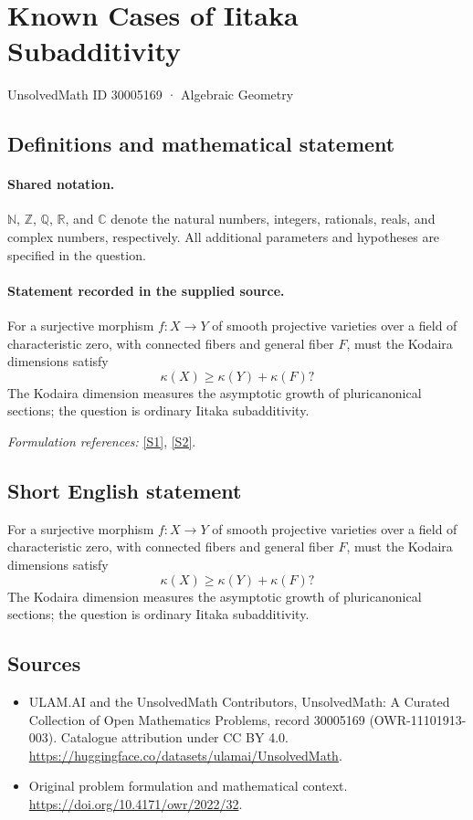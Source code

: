 \documentclass[11pt]{article}
\newcommand{\sref}[2]{\hyperlink{source:#1:#2}{[S#2]}}
\begin{document}
\setcounter{section}{30005168}
\section{Known Cases of Iitaka Subadditivity}\label{30005169}
{\small UnsolvedMath ID 30005169 · Algebraic Geometry}
\subsection{Definitions and mathematical statement}

\paragraph{Shared notation.}$\mathbb N$, $\mathbb Z$, $\mathbb Q$, $\mathbb R$, and $\mathbb C$ denote the natural numbers, integers, rationals, reals, and complex numbers, respectively. All additional parameters and hypotheses are specified in the question.


\paragraph{Statement recorded in the supplied source.}
For a surjective morphism $f:X\to Y$ of smooth projective varieties over a field of characteristic zero, with connected fibers and general fiber $F$, must the Kodaira dimensions satisfy
\[\kappa(X)\geq\kappa(Y)+\kappa(F)?\]
The Kodaira dimension measures the asymptotic growth of pluricanonical sections; the question is ordinary Iitaka subadditivity.
\par\smallskip\textit{Formulation references:} \sref{30005169}{1}, \sref{30005169}{2}.
\subsection{Short English statement}
For a surjective morphism $f:X\to Y$ of smooth projective varieties over a field of characteristic zero, with connected fibers and general fiber $F$, must the Kodaira dimensions satisfy
\[\kappa(X)\geq\kappa(Y)+\kappa(F)?\]
The Kodaira dimension measures the asymptotic growth of pluricanonical sections; the question is ordinary Iitaka subadditivity.
\subsection{Sources}
\begin{itemize}
\item[\hypertarget{source:30005169:1}{S1}] ULAM.AI and the UnsolvedMath Contributors, UnsolvedMath: A Curated Collection of Open Mathematics Problems, record 30005169 (OWR-11101913-003). Catalogue attribution under CC BY 4.0.
\url{https://huggingface.co/datasets/ulamai/UnsolvedMath}.
\item[\hypertarget{source:30005169:2}{S2}] Original problem formulation and mathematical context.
\url{https://doi.org/10.4171/owr/2022/32}.
\end{itemize}
\label{end:30005169}
\end{document}
